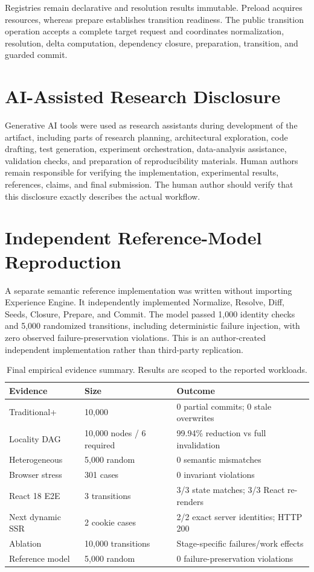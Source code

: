 \documentclass[manuscript,anonymous]{acmart}
\begin{document}
Registries remain declarative and resolution results immutable. Preload acquires resources,
whereas prepare establishes transition readiness. The public transition operation accepts a
complete target request and coordinates normalization, resolution, delta computation,
dependency closure, preparation, transition, and guarded commit.

\section{AI-Assisted Research Disclosure}
Generative AI tools were used as research assistants during development of the artifact,
including parts of research planning, architectural exploration, code drafting, test generation,
experiment orchestration, data-analysis assistance, validation checks, and preparation of
reproducibility materials. Human authors remain responsible for verifying the implementation,
experimental results, references, claims, and final submission. The human author should
verify that this disclosure exactly describes the actual workflow.

\section{Independent Reference-Model Reproduction}
A separate semantic reference implementation was written without importing Experience Engine.
It independently implemented Normalize, Resolve, Diff, Seeds, Closure, Prepare, and Commit.
The model passed 1,000 identity checks and 5,000 randomized transitions, including
deterministic failure injection, with zero observed failure-preservation violations. This is
an author-created independent implementation rather than third-party replication.


\begin{table}[t]
\centering
\caption{Final empirical evidence summary. Results are scoped to the reported workloads.}
\label{tab:evidence}
\small
\begin{tabular}{p{}p{}p{}}
\toprule
Evidence & Size & Outcome\\
\midrule
Traditional+ & 10,000 & 0 partial commits; 0 stale overwrites\\
Locality DAG & 10,000 nodes / 6 required & 99.94\% reduction vs full invalidation\\
Heterogeneous & 5,000 random & 0 semantic mismatches\\
Browser stress & 301 cases & 0 invariant violations\\
React 18 E2E & 3 transitions & 3/3 state matches; 3/3 React re-renders\\
Next dynamic SSR & 2 cookie cases & 2/2 exact server identities; HTTP 200\\
Ablation & 10,000 transitions & Stage-specific failures/work effects\\
Reference model & 5,000 random & 0 failure-preservation violations\\
\bottomrule
\end{tabular}
\end{table}
\end{document}
